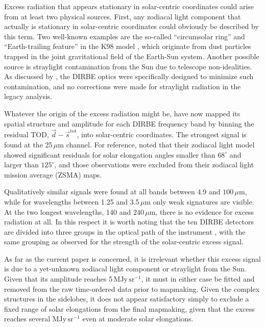 \documentclass{aa}
\newcommand{\dv}[0]{\vec{d}}
\newcommand{\s}[0]{\vec{s}}
\begin{document}
Excess radiation that appears stationary in solar-centric coordinates
could arise from at least two physical sources. First, any zodiacal
light component that actually is stationary in solar-centric
coordinates could obviously be described by this term. Two well-known
examples are the so-called ``circumsolar ring'' and ``Earth-trailing
feature'' in the K98 model \citep{kelsall1998}, which originate from
dust particles trapped in the joint gravitational field of the
Earth-Sun system. Another possible source is straylight contamination
from the Sun due to telescope non-idealities. As discussed by
\citet{hauser1998}, the DIRBE optics were specifically designed to
minimize such contamination, and no corrections were made for
straylight radiation in the legacy analysis. 

Whatever the origin of the excess radiation might be, \citet{CG02_01}
have now mapped its spatial structure and amplitude for each DIRBE
frequency band by binning the residual TOD, $\dv - \s^{\mathrm{tot}}$,
into solar-centric coordinates. The strongest signal is found at the
25\,$\mu\mathrm{m}$ channel.
For reference, \citet{kelsall1998} noted that their
zodiacal light model showed significant residuals for solar elongation
angles smaller than $68^{\circ}$ and larger than $125^{\circ}$, and
those observations were excluded from their zodiacal light mission
average (ZSMA) maps.

Qualitatively similar signals were found at all bands between 4.9 and
$100\,\mu\mathrm{m}$, while for wavelengths between 1.25 and
3.5$\,\mu\mathrm{m}$ only weak signatures are visible. At the two
longest wavelengths, 140 and $240\,\mu\mathrm{m}$, there is no evidence
for excess radiation at all. In this respect it is worth noting that
the ten DIRBE detectors are divided into three groups in the optical
path of the instrument \citep{silverberg93}, with the same
grouping as observed for the strength of the solar-centric excess
signal.

As far as the current paper is concerned, it is irrelevant whether
this excess signal is due to a yet-unknown zodiacal light component or
straylight from the Sun. Given that its amplitude reaches 5\,$\mathrm{MJy\,sr^{-1}}$,
it must in either case be fitted and removed from the raw time-ordered
data prior to mapmaking. Given the complex structures in the sidelobes, it does not appear satisfactory simply to exclude
a fixed range of solar elongations from the final mapmaking, given
that the excess reaches several $\mathrm{MJy\,sr^{-1}}$ even at moderate solar
elongations. 
\end{document}

